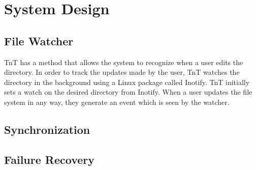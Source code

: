 \section{System Design}

\subsection{File Watcher}
TnT has a method that allows the system to recognize when a user edits the directory.  In order to track the updates made by the user, TnT watches
the directory in the background using a Linux package called Inotify.  TnT initially sets a watch on the desired directory from Inotify.  When a 
user updates the file system in any way, they generate an event which is seen by the watcher.

\subsection{Synchronization}

\subsection{Failure Recovery}


